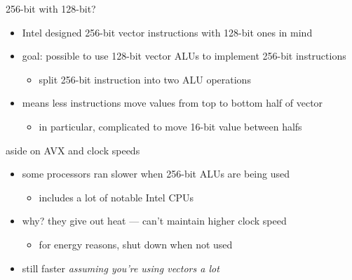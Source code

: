 \begin{frame}{256-bit with 128-bit?}
    \begin{itemize}
    \item Intel designed 256-bit vector instructions with 128-bit ones in mind
    \item goal: possible to use 128-bit vector ALUs to implement 256-bit instructions
        \begin{itemize}
        \item split 256-bit instruction into two ALU operations
        \end{itemize}
    \item means less instructions move values from top to bottom half of vector
        \begin{itemize}
        \item in particular, complicated to move 16-bit value between halfs
        \end{itemize}
    \end{itemize}
\end{frame}

\begin{frame}{aside on AVX and clock speeds}
    \begin{itemize}
    \item some processors ran slower when 256-bit ALUs are being used
        \begin{itemize}
        \item includes a lot of notable Intel CPUs
        \end{itemize}
    \item why? they give out heat --- can't maintain higher clock speed
        \begin{itemize}
        \item for energy reasons, shut down when not used
        \end{itemize}
    \vspace{.5cm}
    \item still faster \textit{assuming you're using vectors a lot}
    \end{itemize}
\end{frame}

